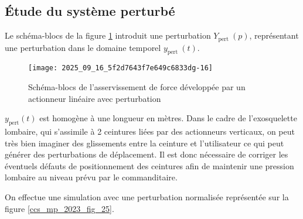 \subsection{Étude du système perturbé}%

\ifprof
\else

Le schéma-blocs de la figure \ref{ccs_mp_2023_fig_24} introduit une perturbation $Y_{\text {pert }}(p)$, représentant une perturbation dans le domaine temporel $y_{\text {pert }}(t)$.



\begin{figure}[!h]
\centering
\texttt{[image: 2025\_09\_16\_5f2d7643f7e649c6833dg-16]}
\caption{\label{ccs_mp_2023_fig_24}  Schéma-blocs de l'asservissement de force développée par un actionneur linéaire avec perturbation}
\end{figure}
\fi


\ifprof
\begin{corrige}
$y_{\text{pert}}(t)$ est homogène à une longueur en mètres. Dans le cadre de l'exosquelette lombaire, qui s'assimile à 2 ceintures liées par des actionneurs verticaux, on peut très bien imaginer des glissements entre la ceinture et l'utilisateur ce qui peut générer des perturbations de déplacement. Il est donc nécessaire de corriger les éventuels défauts de positionnement des ceintures afin de maintenir une pression lombaire au niveau prévu par le commanditaire.
\end{corrige}
\else
\fi

\ifprof
\else

On effectue une simulation avec une perturbation normalisée représentée sur la figure \ref{ccs_mp_2023_fig_25}.


